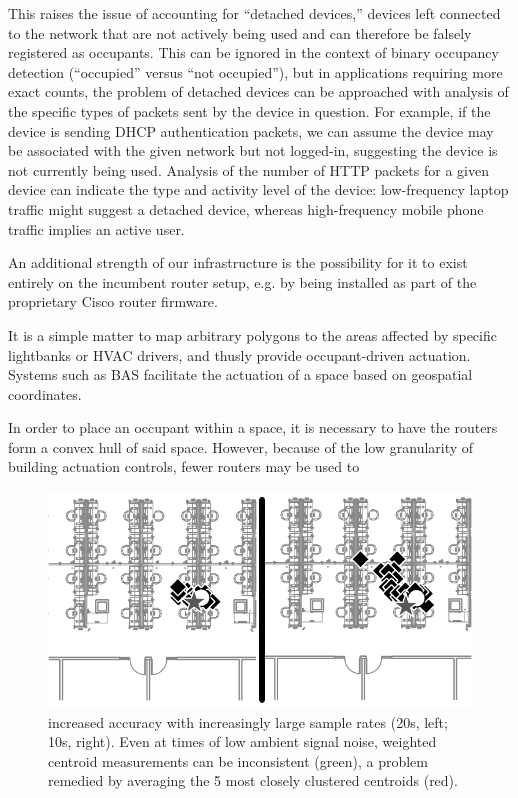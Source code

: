 This raises the issue of accounting for ``detached devices,'' devices left connected to the network that are not actively being used and can therefore be falsely registered as occupants. This can be ignored in the context of binary occupancy detection (``occupied'' versus ``not occupied''), but in applications requiring more exact counts, the problem of detached devices can be approached with analysis of the specific types of packets sent by the device in question. For example, if the device is sending DHCP authentication packets, we can assume the device may be associated with the given network but not logged-in, suggesting the device is not currently being used. Analysis of the number of HTTP packets for a given device can indicate the type and activity level of the device: low-frequency laptop traffic might suggest a detached device, whereas high-frequency mobile phone traffic implies an active user.

An additional strength of our infrastructure is the possibility for it to exist entirely on the incumbent router setup, e.g. by being installed as part of the proprietary Cisco router firmware. 

It is a simple matter to map arbitrary polygons to the areas affected by specific lightbanks or HVAC drivers, and thusly provide occupant-driven actuation. Systems such as BAS facilitate the actuation of a space based on geospatial coordinates.

In order to place an occupant within a space, it is necessary to have the routers form a convex hull of said space. However, because of the low granularity of building actuation controls, fewer routers may be used to 

\begin{figure}[htb]
\begin{center}
\includegraphics[width=.6\linewidth]{figs/samplesize}
\end{center}
\caption{increased accuracy with increasingly large sample rates (20s, left; 10s, right). Even at times of low ambient signal noise, weighted centroid measurements can be inconsistent (green), a problem remedied by averaging the 5 most closely clustered centroids (red).}
\end{figure}

